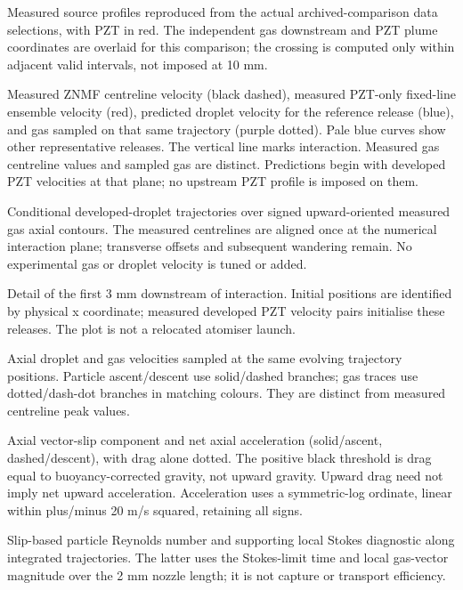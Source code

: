 \caption{Measured source profiles reproduced from the actual archived-comparison data selections, with PZT in red. The independent gas downstream and PZT plume coordinates are overlaid for this comparison; the crossing is computed only within adjacent valid intervals, not imposed at 10 mm.}

\caption{Measured ZNMF centreline velocity (black dashed), measured PZT-only fixed-line ensemble velocity (red), predicted droplet velocity for the reference release (blue), and gas sampled on that same trajectory (purple dotted). Pale blue curves show other representative releases. The vertical line marks interaction. Measured gas centreline values and sampled gas are distinct. Predictions begin with developed PZT velocities at that plane; no upstream PZT profile is imposed on them.}

\caption{Conditional developed-droplet trajectories over signed upward-oriented measured gas axial contours. The measured centrelines are aligned once at the numerical interaction plane; transverse offsets and subsequent wandering remain. No experimental gas or droplet velocity is tuned or added.}

\caption{Detail of the first 3 mm downstream of interaction. Initial positions are identified by physical x coordinate; measured developed PZT velocity pairs initialise these releases. The plot is not a relocated atomiser launch.}

\caption{Axial droplet and gas velocities sampled at the same evolving trajectory positions. Particle ascent/descent use solid/dashed branches; gas traces use dotted/dash-dot branches in matching colours. They are distinct from measured centreline peak values.}

\caption{Axial vector-slip component and net axial acceleration (solid/ascent, dashed/descent), with drag alone dotted. The positive black threshold is drag equal to buoyancy-corrected gravity, not upward gravity. Upward drag need not imply net upward acceleration. Acceleration uses a symmetric-log ordinate, linear within plus/minus 20 m/s squared, retaining all signs.}

\caption{Slip-based particle Reynolds number and supporting local Stokes diagnostic along integrated trajectories. The latter uses the Stokes-limit time and local gas-vector magnitude over the 2 mm nozzle length; it is not capture or transport efficiency.}

